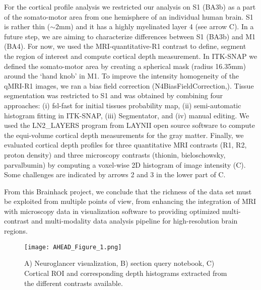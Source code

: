 \documentclass[../main.tex]{subfiles}
\begin{document}
For the cortical profile analysis we restricted our analysis on S1 (BA3b) as a part of the somato-motor area from one hemisphere of an individual human brain. S1 is rather thin (\(\sim\)2mm) and it has a highly myelinated layer 4 (see arrow C). In a future step, we are aiming to characterize differences between S1 (BA3b) and M1 (BA4). For now, we used the MRI-quantitative-R1 contrast to define, segment the region of interest and compute cortical depth measurement. In ITK-SNAP\citep{Yushkevich2006} we defined the somato-motor area by creating a spherical mask (radius 16.35mm) around the ‘hand knob’ in M1. To improve the intensity homogeneity of the qMRI-R1 images, we ran a bias field correction (N4BiasFieldCorrection,\citep{Cox1996}). Tissue segmentation was restricted to S1 and was obtained by combining four approaches: (i) fsl-fast\citep{Smith2004} for initial tissues probability map, (ii) semi-automatic histogram fitting in ITK-SNAP, (iii) Segmentator\citep{Gulban2018}, and (iv) manual editing. We used the LN2\_LAYERS program from LAYNII open source software\citep{Huber2021}  to compute the equi-volume cortical depth measurements for the gray matter. Finally, we evaluated cortical depth profiles for three quantitative MRI contrasts (R1, R2, proton density) and three microscopy contrasts (thionin, bieloschowsky, parvalbumin) by computing a voxel-wise 2D histogram of image intensity (C). Some challenges are indicated by arrows 2 and 3 in the lower part of C.

From this Brainhack project, we conclude that the richness of the data set must be exploited from multiple points of view, from enhancing the integration of MRI with microscopy data in visualization software to providing optimized multi-contrast and multi-modality data analysis pipeline for high-resolution brain regions.



\begin{figure*}
	\centering
	\texttt{[image: AHEAD\_Figure\_1.png]}
	\caption{A) Neuroglancer visualization, B) section query notebook, C) Cortical ROI and corresponding depth histograms extracted from the different contrasts available.
	}
	\label{fig:ahead}
\end{figure*}
\end{document}
